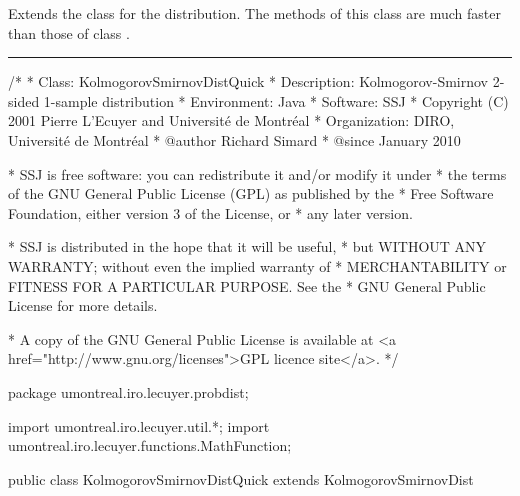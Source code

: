 
Extends the class  for the \ks{} distribution.
The methods of this class %
are much faster than those of class
.

\begin{htmlonly}
\end{htmlonly}%
\begin{latexonly}%
\end{latexonly}%


\bigskip\hrule

\begin{code}\begin{hide}
/*
 * Class:        KolmogorovSmirnovDistQuick
 * Description:  Kolmogorov-Smirnov 2-sided 1-sample distribution
 * Environment:  Java
 * Software:     SSJ
 * Copyright (C) 2001  Pierre L'Ecuyer and Université de Montréal
 * Organization: DIRO, Université de Montréal
 * @author       Richard Simard
 * @since        January 2010

 * SSJ is free software: you can redistribute it and/or modify it under
 * the terms of the GNU General Public License (GPL) as published by the
 * Free Software Foundation, either version 3 of the License, or
 * any later version.

 * SSJ is distributed in the hope that it will be useful,
 * but WITHOUT ANY WARRANTY; without even the implied warranty of
 * MERCHANTABILITY or FITNESS FOR A PARTICULAR PURPOSE.  See the
 * GNU General Public License for more details.

 * A copy of the GNU General Public License is available at
   <a href="http://www.gnu.org/licenses">GPL licence site</a>.
 */
\end{hide}
package umontreal.iro.lecuyer.probdist;
\begin{hide}
import umontreal.iro.lecuyer.util.*;
import umontreal.iro.lecuyer.functions.MathFunction;
\end{hide}

public class KolmogorovSmirnovDistQuick extends KolmogorovSmirnovDist \begin{hide} {

   /*
      For n <= NEXACT, we use exact algorithms: the Durbin matrix and
      the Pomeranz algorithms. For n > NEXACT, we use asymptotic methods
      except for x close to 0 where we still use the method of Durbin
      for n <= NKOLMO. For n > NKOLMO, we use asymptotic methods only and
      so the precision is less for x close to 0.
      We could increase the limit NKOLMO to 10^6 to get better precision
      for x close to 0, but at the price of a slower speed.
   */
   private static final int NKOLMO = 100000;
\end{hide}
\end{code}
